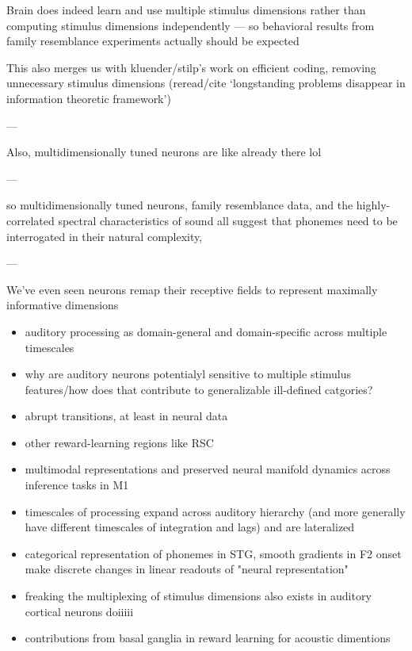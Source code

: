 \begin{multicols}{2}
Brain does indeed learn and use multiple stimulus dimensions rather than computing stimulus dimensions independently --- so behavioral results from family resemblance experiments actually should be expected\cite{macellaioWhySensoryNeurons2020}

This also merges us with kluender/stilp's work on efficient coding, removing unnecessary stimulus dimensions (reread/cite `longstanding problems disappear in information theoretic framework')

---

Also, multidimensionally tuned neurons are like already there lol

---

so multidimensionally tuned neurons, family resemblance data, and the highly-correlated spectral characteristics of sound all suggest that phonemes need to be interrogated in their natural complexity, 

---

We've even seen neurons remap their receptive fields to represent maximally informative dimensions\cite{Polley2006}

\begin{itemize}
\item auditory processing as domain-general and domain-specific across multiple timescales \cite{norman-haignereHierarchicalIntegrationMultiple2020}
\item why are auditory neurons potentialyl sensitive to multiple stimulus features/how does that contribute to generalizable ill-defined catgories? \cite{macellaioWhySensoryNeurons2020}
\item abrupt transitions, at least in neural data \cite{durstewitzAbruptTransitionsPrefrontal2010}
\item other reward-learning regions like RSC \cite{millerRetrosplenialCorticalRepresentations2019}
\item multimodal representations and preserved neural manifold dynamics across inference tasks in M1 \cite{gallegoCorticalPopulationActivity2018}
\item timescales of processing expand across auditory hierarchy (and more generally have different timescales of integration and lags) \cite{norman-haignereHierarchicalIntegrationMultiple2020} and are lateralized \cite{levyCircuitAsymmetriesUnderlie2019a}
\item categorical representation of phonemes in STG, smooth gradients in F2 onset make discrete changes in linear readouts of "neural representation" \cite{changCategoricalSpeechRepresentation2010b}
\item freaking the multiplexing of stimulus dimensions also exists in auditory cortical neurons doiiiii \cite{walkerMultiplexedRobustRepresentations2011,bizleyInterdependentEncodingPitch2009b}
\item contributions from basal ganglia in reward learning for acoustic dimentions \cite{limHowMayBasal2014}
\end{itemize}


\end{multicols}
